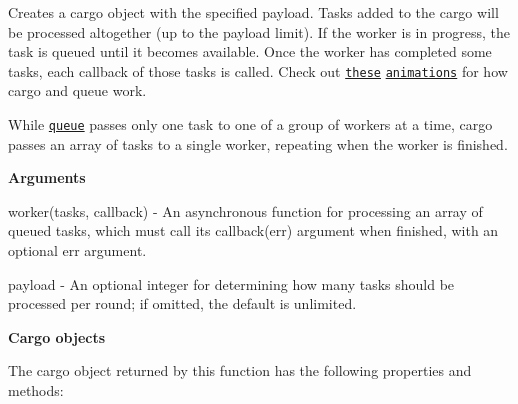 Creates a {\ttfamily cargo} object with the specified payload. Tasks added to the cargo will be processed altogether (up to the {\ttfamily payload} limit). If the {\ttfamily worker} is in progress, the task is queued until it becomes available. Once the {\ttfamily worker} has completed some tasks, each callback of those tasks is called. Check out \href{https://camo.githubusercontent.com/6bbd36f4cf5b35a0f11a96dcd2e97711ffc2fb37/68747470733a2f2f662e636c6f75642e6769746875622e636f6d2f6173736574732f313637363837312f36383130382f62626330636662302d356632392d313165322d393734662d3333393763363464633835382e676966}{\tt these} \href{https://camo.githubusercontent.com/f4810e00e1c5f5f8addbe3e9f49064fd5d102699/68747470733a2f2f662e636c6f75642e6769746875622e636f6d2f6173736574732f313637363837312f36383130312f38346339323036362d356632392d313165322d383134662d3964336430323431336266642e676966}{\tt animations} for how {\ttfamily cargo} and {\ttfamily queue} work.

While \href{#queue}{\tt queue} passes only one task to one of a group of workers at a time, cargo passes an array of tasks to a single worker, repeating when the worker is finished.

{\bfseries Arguments}


\begin{DoxyItemize}
\item {\ttfamily worker(tasks, callback)} -\/ An asynchronous function for processing an array of queued tasks, which must call its {\ttfamily callback(err)} argument when finished, with an optional {\ttfamily err} argument.
\item {\ttfamily payload} -\/ An optional {\ttfamily integer} for determining how many tasks should be processed per round; if omitted, the default is unlimited.
\end{DoxyItemize}

{\bfseries Cargo objects}

The {\ttfamily cargo} object returned by this function has the following properties and methods\+:


